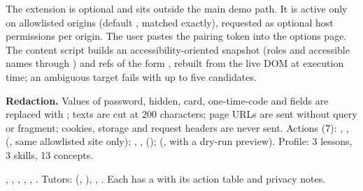 The extension is optional and sits outside the main demo path. It is active only on allowlisted origins (default , matched exactly), requested as optional host permissions per origin. The user pastes the pairing token into the options page. The content script builds an accessibility-oriented snapshot (roles and accessible names through ) and refs of the form , rebuilt from the live DOM at execution time; an ambiguous target fails with up to five candidates.

\textbf{Redaction.} Values of password, hidden, card, one-time-code and  fields are replaced with \code{[redacted]}; texts are cut at 200 characters; page URLs are sent without query or fragment; cookies, storage and request headers are never sent. Actions (7): , ,  (, same allowlisted site only); , ,  ();  (, with a dry-run preview). Profile: 3 lessons, 3 skills, 13 concepts.

\begin{wherebox}
, , , , , . Tutors:  (, ), , . Each has a  with its action table and privacy notes.
\end{wherebox}



